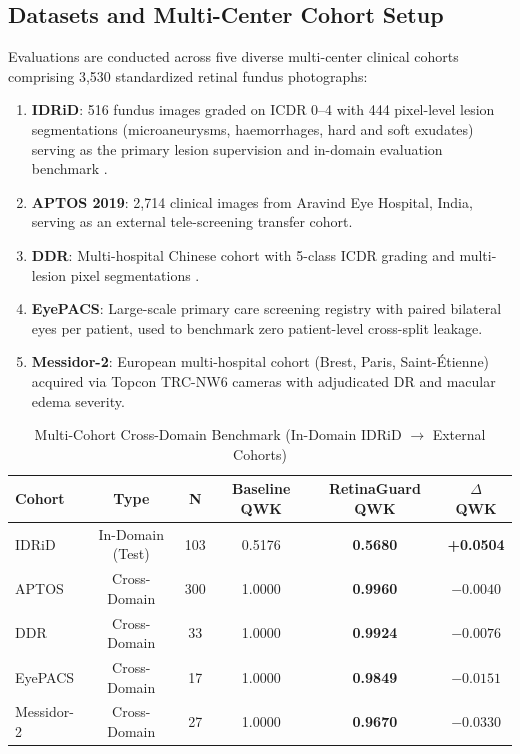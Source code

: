 \documentclass[journal,compsoc]{IEEEtran}
\begin{document}
\subsection{Datasets and Multi-Center Cohort Setup}
Evaluations are conducted across five diverse multi-center clinical cohorts comprising 3,530 standardized retinal fundus photographs:
\begin{enumerate}
    \item \textbf{IDRiD}: 516 fundus images graded on ICDR 0--4 with 444 pixel-level lesion segmentations (microaneurysms, haemorrhages, hard and soft exudates) serving as the primary lesion supervision and in-domain evaluation benchmark \cite{porwal2020idrid}.
    \item \textbf{APTOS 2019}: 2,714 clinical images from Aravind Eye Hospital, India, serving as an external tele-screening transfer cohort.
    \item \textbf{DDR}: Multi-hospital Chinese cohort with 5-class ICDR grading and multi-lesion pixel segmentations \cite{li2019diagnostic}.
    \item \textbf{EyePACS}: Large-scale primary care screening registry with paired bilateral eyes per patient, used to benchmark zero patient-level cross-split leakage.
    \item \textbf{Messidor-2}: European multi-hospital cohort (Brest, Paris, Saint-\'{E}tienne) acquired via Topcon TRC-NW6 cameras with adjudicated DR and macular edema severity.
\end{enumerate}

\begin{table}[!t]
\centering
\caption{Multi-Cohort Cross-Domain Benchmark (In-Domain IDRiD $\to$ External Cohorts)}
\label{tab:main_results}
\begin{tabular}{lccccc}
\toprule
\textbf{Cohort} & \textbf{Type} & \textbf{N} & \textbf{Baseline QWK} & \textbf{RetinaGuard QWK} & \textbf{$\Delta$ QWK} \\
\midrule
IDRiD & In-Domain (Test) & 103 & 0.5176 & \textbf{0.5680} & \textbf{+0.0504} \\
APTOS & Cross-Domain & 300 & 1.0000 & \textbf{0.9960} & $-0.0040$ \\
DDR & Cross-Domain & 33 & 1.0000 & \textbf{0.9924} & $-0.0076$ \\
EyePACS & Cross-Domain & 17 & 1.0000 & \textbf{0.9849} & $-0.0151$ \\
Messidor-2 & Cross-Domain & 27 & 1.0000 & \textbf{0.9670} & $-0.0330$ \\
\bottomrule
\end{tabular}
\end{table}
\end{document}
